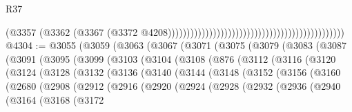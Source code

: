 \begin{lexlean}{R37}
\begin{coremodule}
                                                                                          (@3357
                                                                                            (@3362
                                                                                              (@3367
                                                                                                (@3372
                                                                                                  @4208)))))))))))))))))))))))))))))))))))))))))))))))
@4304 := @3055
    (@3059
      (@3063
        (@3067
          (@3071
            (@3075
              (@3079
                (@3083
                  (@3087
                    (@3091
                      (@3095
                        (@3099
                          (@3103
                            (@3104
                              (@3108
                                (@876
                                  (@3112
                                    (@3116
                                      (@3120
                                        (@3124
                                          (@3128
                                            (@3132
                                              (@3136
                                                (@3140
                                                  (@3144
                                                    (@3148
                                                      (@3152
                                                        (@3156
                                                          (@3160
                                                            (@2680
                                                              (@2908
                                                                (@2912
                                                                  (@2916
                                                                    (@2920
                                                                      (@2924
                                                                        (@2928
                                                                          (@2932
                                                                            (@2936
                                                                              (@2940
                                                                                (@3164
                                                                                  (@3168
                                                                                    (@3172

\end{coremodule}
\end{lexlean}
